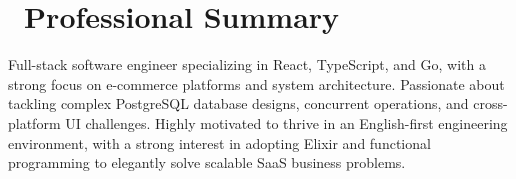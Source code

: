 \section{\faUser\ Professional Summary}
Full-stack software engineer specializing in React, TypeScript, and Go, with a strong focus on e-commerce platforms and system architecture. Passionate about tackling complex PostgreSQL database designs, concurrent operations, and cross-platform UI challenges. Highly motivated to thrive in an English-first engineering environment, with a strong interest in adopting Elixir and functional programming to elegantly solve scalable SaaS business problems.